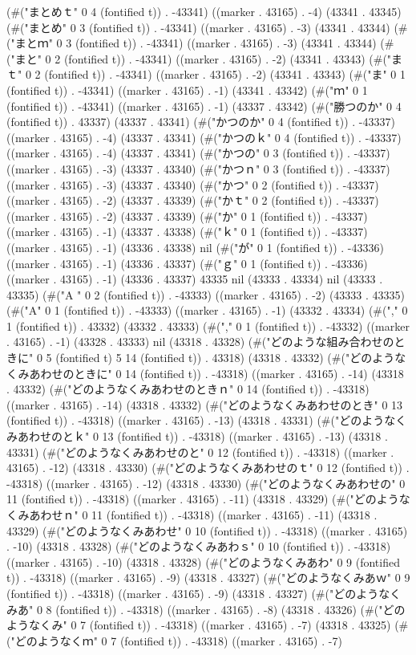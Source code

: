(#("まとめｔ" 0 4 (fontified t)) . -43341) ((marker . 43165) . -4) (43341 . 43345) (#("まとめ" 0 3 (fontified t)) . -43341) ((marker . 43165) . -3) (43341 . 43344) (#("まとｍ" 0 3 (fontified t)) . -43341) ((marker . 43165) . -3) (43341 . 43344) (#("まと" 0 2 (fontified t)) . -43341) ((marker . 43165) . -2) (43341 . 43343) (#("まｔ" 0 2 (fontified t)) . -43341) ((marker . 43165) . -2) (43341 . 43343) (#("ま" 0 1 (fontified t)) . -43341) ((marker . 43165) . -1) (43341 . 43342) (#("ｍ" 0 1 (fontified t)) . -43341) ((marker . 43165) . -1) (43337 . 43342) (#("勝つのか" 0 4 (fontified t)) . 43337) (43337 . 43341) (#("かつのか" 0 4 (fontified t)) . -43337) ((marker . 43165) . -4) (43337 . 43341) (#("かつのｋ" 0 4 (fontified t)) . -43337) ((marker . 43165) . -4) (43337 . 43341) (#("かつの" 0 3 (fontified t)) . -43337) ((marker . 43165) . -3) (43337 . 43340) (#("かつｎ" 0 3 (fontified t)) . -43337) ((marker . 43165) . -3) (43337 . 43340) (#("かつ" 0 2 (fontified t)) . -43337) ((marker . 43165) . -2) (43337 . 43339) (#("かｔ" 0 2 (fontified t)) . -43337) ((marker . 43165) . -2) (43337 . 43339) (#("か" 0 1 (fontified t)) . -43337) ((marker . 43165) . -1) (43337 . 43338) (#("ｋ" 0 1 (fontified t)) . -43337) ((marker . 43165) . -1) (43336 . 43338) nil (#("が" 0 1 (fontified t)) . -43336) ((marker . 43165) . -1) (43336 . 43337) (#("ｇ" 0 1 (fontified t)) . -43336) ((marker . 43165) . -1) (43336 . 43337) 43335 nil (43333 . 43334) nil (43333 . 43335) (#("A " 0 2 (fontified t)) . -43333) ((marker . 43165) . -2) (43333 . 43335) (#("A" 0 1 (fontified t)) . -43333) ((marker . 43165) . -1) (43332 . 43334) (#("," 0 1 (fontified t)) . 43332) (43332 . 43333) (#("," 0 1 (fontified t)) . -43332) ((marker . 43165) . -1) (43328 . 43333) nil (43318 . 43328) (#("どのような組み合わせのときに" 0 5 (fontified t) 5 14 (fontified t)) . 43318) (43318 . 43332) (#("どのようなくみあわせのときに" 0 14 (fontified t)) . -43318) ((marker . 43165) . -14) (43318 . 43332) (#("どのようなくみあわせのときｎ" 0 14 (fontified t)) . -43318) ((marker . 43165) . -14) (43318 . 43332) (#("どのようなくみあわせのとき" 0 13 (fontified t)) . -43318) ((marker . 43165) . -13) (43318 . 43331) (#("どのようなくみあわせのとｋ" 0 13 (fontified t)) . -43318) ((marker . 43165) . -13) (43318 . 43331) (#("どのようなくみあわせのと" 0 12 (fontified t)) . -43318) ((marker . 43165) . -12) (43318 . 43330) (#("どのようなくみあわせのｔ" 0 12 (fontified t)) . -43318) ((marker . 43165) . -12) (43318 . 43330) (#("どのようなくみあわせの" 0 11 (fontified t)) . -43318) ((marker . 43165) . -11) (43318 . 43329) (#("どのようなくみあわせｎ" 0 11 (fontified t)) . -43318) ((marker . 43165) . -11) (43318 . 43329) (#("どのようなくみあわせ" 0 10 (fontified t)) . -43318) ((marker . 43165) . -10) (43318 . 43328) (#("どのようなくみあわｓ" 0 10 (fontified t)) . -43318) ((marker . 43165) . -10) (43318 . 43328) (#("どのようなくみあわ" 0 9 (fontified t)) . -43318) ((marker . 43165) . -9) (43318 . 43327) (#("どのようなくみあｗ" 0 9 (fontified t)) . -43318) ((marker . 43165) . -9) (43318 . 43327) (#("どのようなくみあ" 0 8 (fontified t)) . -43318) ((marker . 43165) . -8) (43318 . 43326) (#("どのようなくみ" 0 7 (fontified t)) . -43318) ((marker . 43165) . -7) (43318 . 43325) (#("どのようなくｍ" 0 7 (fontified t)) . -43318) ((marker . 43165) . -7) 